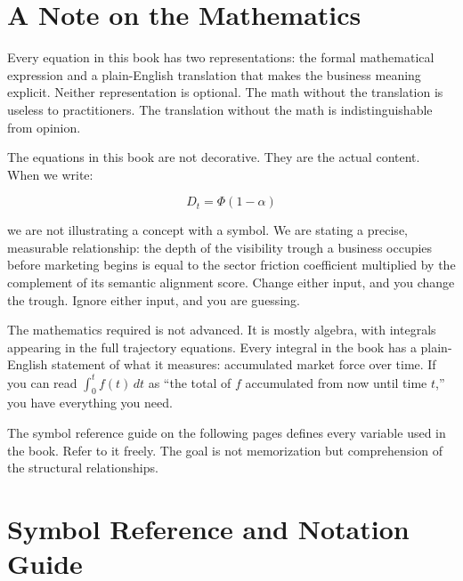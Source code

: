 \documentclass[12pt, openany]{book}
\theoremstyle{thmstyle}
\theoremstyle{defstyle}
\begin{document}
\newpage

\chapter*{A Note on the Mathematics}

Every equation in this book has two representations: the formal mathematical expression and a plain-English translation that makes the business meaning explicit. Neither representation is optional. The math without the translation is useless to practitioners. The translation without the math is indistinguishable from opinion.

The equations in this book are not decorative. They are the actual content. When we write:

\[
D_t = \Phi(1 - \alpha)
\]

we are not illustrating a concept with a symbol. We are stating a precise, measurable relationship: the depth of the visibility trough a business occupies before marketing begins is equal to the sector friction coefficient multiplied by the complement of its semantic alignment score. Change either input, and you change the trough. Ignore either input, and you are guessing.

\vspace{8pt}

The mathematics required is not advanced. It is mostly algebra, with integrals appearing in the full trajectory equations. Every integral in the book has a plain-English statement of what it measures: accumulated market force over time. If you can read $\int_0^t f(t)\,dt$ as ``the total of $f$ accumulated from now until time $t$,'' you have everything you need.

The symbol reference guide on the following pages defines every variable used in the book. Refer to it freely. The goal is not memorization but comprehension of the structural relationships.

\newpage

\chapter*{Symbol Reference and Notation Guide}
\end{document}
